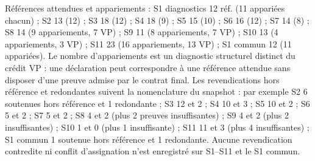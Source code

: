 \documentclass[11pt,a4paper]{article}
\begin{document}
R\'ef\'erences attendues et appariements : S1 diagnostics 12 r\'ef. (11 appari\'ees chacun) ; S2 13 (12) ; S3 18 (12) ; S4 18 (9) ; S5 15 (10) ; S6 16 (12) ; S7 14 (8) ; S8 14 (9 appariements, 7 VP) ; S9 11 (8 appariements, 7 VP) ; S10 13 (4 appariements, 3 VP) ; S11 23 (16 appariements, 13 VP) ; S1 commun 12 (11 appari\'ees). Le nombre d'appariements est un diagnostic structurel distinct du cr\'edit VP : une d\'eclaration peut correspondre \`a une r\'ef\'erence attendue sans disposer d'une preuve admise par le contrat final. Les revendications hors r\'ef\'erence et redondantes suivent la nomenclature du snapshot : par exemple S2 6 soutenues hors r\'ef\'erence et 1 redondante ; S3 12 et 2 ; S4 10 et 3 ; S5 10 et 2 ; S6 5 et 2 ; S7 5 et 2 ; S8 4 et 2 (plus 2 preuves insuffisantes) ; S9 4 et 2 (plus 2 insuffisantes) ; S10 1 et 0 (plus 1 insuffisante) ; S11 11 et 3 (plus 4 insuffisantes) ; S1 commun 1 soutenue hors r\'ef\'erence et 1 redondante. Aucune revendication contredite ni conflit d'assignation n'est enregistr\'e sur S1--S11 et le S1 commun.
\end{document}
